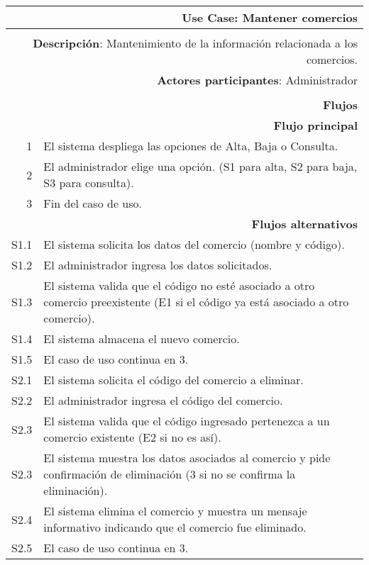 \begin{tabularx}{\textwidth}{| r | X |}
\hline
\multicolumn{2}{|X|}{
\textbf{Use Case}: Mantener comercios} \\

\hline
\multicolumn{2}{|c|}{\cellcolor[gray]{0.6}} \\

\hline
\multicolumn{2}{|X|}{
\textbf{Descripción}: Mantenimiento de la información relacionada a los
comercios.} \\

\hline
\multicolumn{2}{|X|}{
\textbf{Actores participantes}: Administrador} \\

\hline
\multicolumn{2}{|c|}{\cellcolor[gray]{0.6} } \\

\hline
\multicolumn{2}{|X|}{
\textbf{Flujos}} \\

\hline
\multicolumn{2}{|X|}{
\textbf{Flujo principal}} \\

\hline
1 & El sistema despliega las opciones de Alta, Baja o Consulta. \\
\hline
2 & El administrador elige una opción. (S1 para alta, S2 para baja, S3 para
consulta). \\
\hline
3 & Fin del caso de uso. \\

\hline
\multicolumn{2}{|X|}{
\textbf{Flujos alternativos}} \\

\hline
S1.1 & El sistema solicita los datos del comercio (nombre y código). \\
\hline
S1.2 & El administrador ingresa los datos solicitados. \\
\hline
S1.3 & El sistema valida que el código no esté asociado a otro comercio
preexistente (E1 si el código ya está asociado a otro comercio). \\
\hline
S1.4 & El sistema almacena el nuevo comercio. \\
\hline
S1.5 & El caso de uso continua en 3. \\

\hline
S2.1 & El sistema solicita el código del comercio a eliminar. \\
\hline
S2.2 & El administrador ingresa el código del comercio. \\
\hline
S2.3 & El sistema valida que el código ingresado pertenezca a un comercio
existente (E2 si no es así). \\
\hline
S2.3 & El sistema muestra los datos asociados al comercio y pide confirmación
de eliminación (3 si no se confirma la eliminación). \\
\hline
S2.4 & El sistema elimina el comercio y muestra un mensaje informativo
indicando que el comercio fue eliminado. \\
\hline
S2.5 & El caso de uso continua en 3. \\


\end{tabularx}
